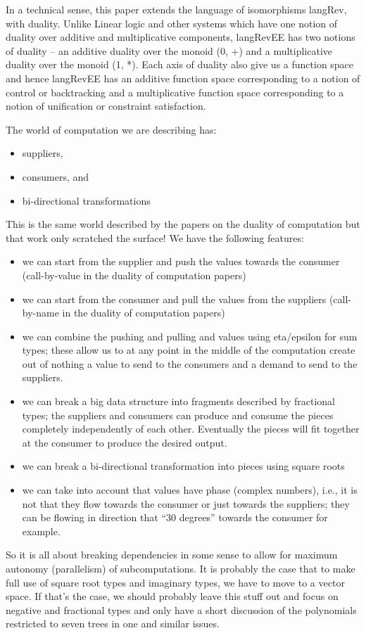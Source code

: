 \documentclass[preprint]{sigplanconf}
\begin{document}
In a technical sense, this paper extends the language of isomorphisms
{{langRev}}, with duality. Unlike Linear logic \cite{Girard87tcs} and
other systems which have one notion of duality over additive and
multiplicative components, {{langRevEE}} has two notions of duality
-- an additive duality over the monoid {{(0, +)}} and a multiplicative
duality over the monoid {{(1, *)}}. Each axis of duality also give us
a function space and hence {{langRevEE}} has an additive function
space corresponding to a notion of control or backtracking and a
multiplicative function space corresponding to a notion of unification
or constraint satisfaction.

The world of computation we are describing has:
\begin{itemize}
\item suppliers, 
\item consumers, and
\item bi-directional transformations
\end{itemize}
This is the same world described by the papers on the duality of computation
but that work only scratched the surface! We have the following features:
\begin{itemize}
\item we can start from the supplier and push the values towards the
  consumer (call-by-value in the duality of computation papers)
\item we can start from the consumer and pull the values from the suppliers
  (call-by-name in the duality of computation papers)
\item we can combine the pushing and pulling and values using eta/epsilon for
  sum types; these allow us to at any point in the middle of the computation
  create out of nothing a value to send to the consumers and a demand to send
  to the suppliers.
\item we can break a big data structure into fragments described by
  fractional types; the suppliers and consumers can produce and consume the
  pieces completely independently of each other. Eventually the pieces will
  fit together at the consumer to produce the desired output.
\item we can break a bi-directional transformation into pieces using square
  roots
\item we can take into account that values have phase (complex numbers),
  i.e., it is not that they flow towards the consumer or just towards the
  suppliers; they can be flowing in direction that ``30 degrees'' towards the
  consumer for example.
\end{itemize}
So it is all about breaking dependencies in some sense to allow for maximum
autonomy (parallelism) of subcomputations. It is probably the case that to
make full use of square root types and imaginary types, we have to move to a
vector space. If that's the case, we should probably leave this stuff out and
focus on negative and fractional types and only have a short discussion of
the polynomials restricted to seven trees in one and similar issues.
\end{document}
